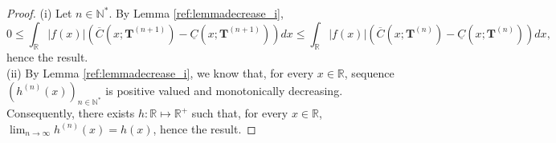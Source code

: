 \documentclass[review]{elsarticle}
\begin{document}
\begin{proof}
(i) Let $n \in \mathbb{N}^*$. By Lemma \ref{ref:lemmadecrease_i},
\begin{equation}
0 \leq \int_{\mathbb{R}} |f(x)| \left(\overline{C}(x;\mathbf{T}^{(n+1)}) - \underline{C}(x;\mathbf{T}^{(n+1)})\right) dx \leq 
\int_{\mathbb{R}} |f(x)| \left(\overline{C}(x;\mathbf{T}^{(n)}) - \underline{C}(x;\mathbf{T}^{(n)})\right) dx,
\end{equation}
hence the result. \\

(ii) By Lemma \ref{ref:lemmadecrease_i}, we know that, for every $x \in \mathbb{R}$, sequence $(h^{(n)}(x))_{n \in \mathbb{N}^*}$ is positive valued and monotonically decreasing. Consequently, there exists $h : \mathbb{R} \mapsto \mathbb{R}^+$ such that, for every $x \in \mathbb{R}$, $\lim_{n \rightarrow \infty} h^{(n)}(x) = h(x)$, hence the result.  
\end{proof}
\end{document}
